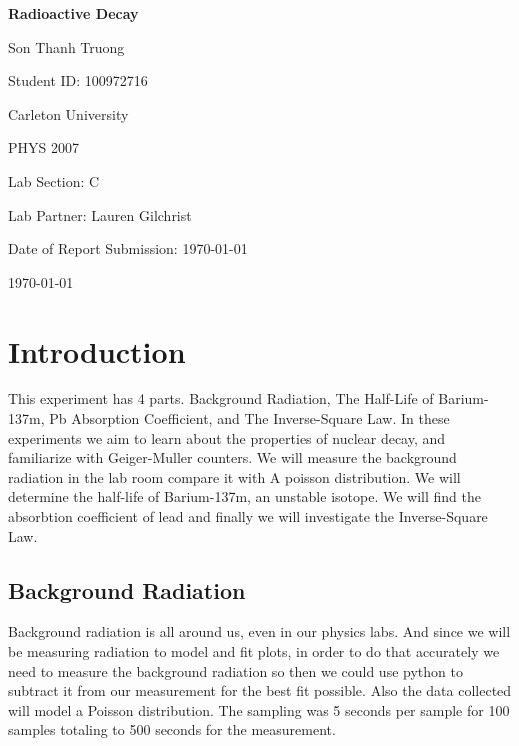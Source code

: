 \documentclass[12pt,letterpaper]{article}
\begin{document}
\begin{titlepage}
    \centering
    \vspace*{3cm}

    {\Huge\bfseries Radioactive Decay\par}

    \vspace{2cm}

    {\Large Son Thanh Truong\par}
    {\Large Student ID: 100972716\par}
    \vspace{0.5cm}
    {\large Carleton University\par}
    {\large PHYS 2007\par}
    {\large Lab Section: C\par}
    {\large Lab Partner: Lauren Gilchrist\par}
    {\large Date of Report Submission: \today\par}
    
    
    \vfill

    {\large \today\par}
\end{titlepage}




\section{Introduction}

This experiment has 4 parts. Background Radiation,
The Half-Life of Barium-137m, Pb Absorption Coefficient,
and The Inverse-Square Law. In these experiments we aim
to learn about the properties of nuclear decay, and familiarize
with Geiger-Muller counters. We will measure the background
radiation in the lab room compare it with A poisson
distribution. We will determine the half-life of Barium-137m, 
an unstable isotope. We will find the absorbtion coefficient
of lead and finally we will investigate the
Inverse-Square Law.

\subsection{Background Radiation}

Background radiation is all around us, even in our physics labs.
And since we will be measuring radiation to model and fit plots,
in order to do that accurately we need to measure the background
radiation so then we could use python to subtract it from our
measurement for the best fit possible. Also the data collected
will model a Poisson distribution. The sampling was 
5 seconds per sample for 100 samples totaling to 500 seconds
for the measurement.
\end{document}

